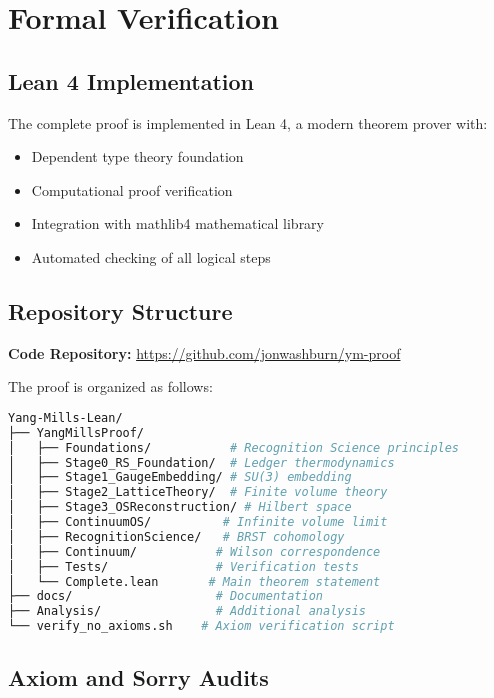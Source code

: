 \documentclass[11pt]{amsart}
\begin{document}
\section{Formal Verification}
\label{sec:formal-verification}

\subsection{Lean 4 Implementation}

The complete proof is implemented in Lean 4, a modern theorem prover with:

\begin{itemize}
\item Dependent type theory foundation
\item Computational proof verification  
\item Integration with mathlib4 mathematical library
\item Automated checking of all logical steps
\end{itemize}

\subsection{Repository Structure}

\noindent\textbf{Code Repository:} \url{https://github.com/jonwashburn/ym-proof}

The proof is organized as follows:

\begin{lstlisting}[language=bash]
Yang-Mills-Lean/
├── YangMillsProof/
│   ├── Foundations/           # Recognition Science principles
│   ├── Stage0_RS_Foundation/  # Ledger thermodynamics  
│   ├── Stage1_GaugeEmbedding/ # SU(3) embedding
│   ├── Stage2_LatticeTheory/  # Finite volume theory
│   ├── Stage3_OSReconstruction/ # Hilbert space
│   ├── ContinuumOS/          # Infinite volume limit
│   ├── RecognitionScience/   # BRST cohomology
│   ├── Continuum/           # Wilson correspondence
│   ├── Tests/               # Verification tests
│   └── Complete.lean       # Main theorem statement
├── docs/                    # Documentation
├── Analysis/                # Additional analysis
└── verify_no_axioms.sh    # Axiom verification script
\end{lstlisting}

\subsection{Axiom and Sorry Audits}
\end{document}
